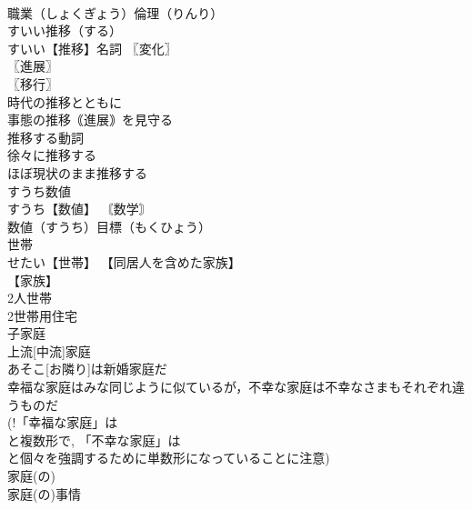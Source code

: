\documentclass[8pt]{extreport}
\begin{document}
\begin{CJK}{UTF8}{min}
\\	職業（しょくぎょう）倫理（りんり） 
\\	すいい推移（する）		
\\	すいい【推移】名詞 〖変化〗
\\	〖進展〗
\\	〖移行〗
\\	時代の推移とともに 
\\	事態の推移｟進展｠を見守る 
\\	推移する動詞 
\\	徐々に推移する 
\\	ほぼ現状のまま推移する 
\\	すうち数値		
\\	すうち【数値】 〘数学〙
\\	数値（すうち）目標（もくひょう） 
\\	世帯		
\\	せたい【世帯】 【同居人を含めた家族】
\\	【家族】
\\	2人世帯 
\\	2世帯用住宅 
\\	[｟米｠ 
\\	世帯数 
\\	世帯主 
\\	かてい【家庭】名詞 
\\	〖所帯〗
\\	使い分け 
\\	家族とともに暮らす場としての家をさす
\\	暖かい家庭的雰囲気を含意する. 
\\	社会単位としての家族をさす
\\	使用人や下宿人なども含む，所帯の全員をさす
\\	~家庭 
\\	楽しい家庭 
\\	裕福な家庭 
\\	崩壊家庭 
\\	母[父]子家庭 
\\	上流[中流]家庭 
\\	あそこ[お隣り]は新婚家庭だ 
\\	幸福な家庭はみな同じように似ているが，不幸な家庭は不幸なさまもそれぞれ違うものだ 
\\	(!「幸福な家庭」は 
\\	と複数形で, 「不幸な家庭」は 
\\	と個々を強調するために単数形になっていることに注意) 
\\	家庭(の)~ 
\\	家庭(の)事情 

\end{CJK}
\end{document}
